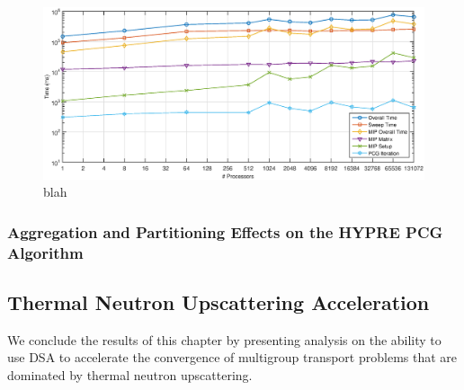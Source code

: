 \begin{figure}
\centering
\includegraphics[width=\textwidth]{figures/sec_DSA/Vulcan_DSA_Timing.eps}
\caption{blah}
\label{fig::DSA_Vulcan_MIP_Timing}
\end{figure}

\subsubsection{Aggregation and Partitioning Effects on the HYPRE PCG Algorithm}
\label{sec::DSA_Results_Scaling_Parametric}

\subsection{Thermal Neutron Upscattering Acceleration}
\label{sec::DSA_Results_IM1}

We conclude the results of this chapter by presenting analysis on the ability to use DSA to accelerate the convergence of multigroup transport problems that are dominated by thermal neutron upscattering.

